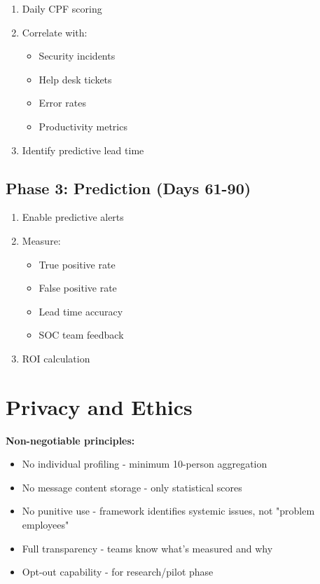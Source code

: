 \documentclass[11pt,a4paper]{article}
\begin{document}
\begin{enumerate}
\item Daily CPF scoring
\item Correlate with:
   \begin{itemize}
   \item Security incidents
   \item Help desk tickets
   \item Error rates
   \item Productivity metrics
   \end{itemize}
\item Identify predictive lead time
\end{enumerate}

\subsection{Phase 3: Prediction (Days 61-90)}

\begin{enumerate}
\item Enable predictive alerts
\item Measure:
   \begin{itemize}
   \item True positive rate
   \item False positive rate
   \item Lead time accuracy
   \item SOC team feedback
   \end{itemize}
\item ROI calculation
\end{enumerate}

\section{Privacy and Ethics}

\textbf{Non-negotiable principles:}

\begin{itemize}
\item No individual profiling - minimum 10-person aggregation
\item No message content storage - only statistical scores
\item No punitive use - framework identifies systemic issues, not "problem employees"
\item Full transparency - teams know what's measured and why
\item Opt-out capability - for research/pilot phase
\end{itemize}
\end{document}

